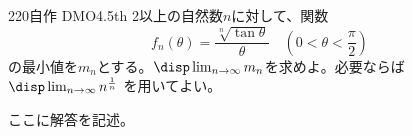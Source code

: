 \begin{prob}{220}{}{自作 DMO4.5th}
 2以上の自然数$n$に対して、関数
 \[ f_n(\theta)=\frac{\sqrt[n]{\tan\theta}}{\theta} \quad (0<\theta<\frac{\pi}{2}) \]
 の最小値を$m_n$とする。$\disp \lim_{n\to\infty} m_n$を求めよ。必要ならば$\disp \lim_{n\to\infty} n^{\frac{1}{n}}$ を用いてよい。
\end{prob}
ここに解答を記述。
